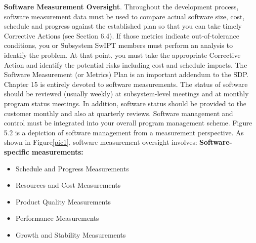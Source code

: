 \documentclass{book}
\begin{document}
\begin{multicols}{2}
		\textbf{Software Measurement Oversight}. Throughout the
		development process, software measurement data must
		be used to compare actual software size, cost, schedule
		and progress against the established plan so that you
		can take timely Corrective Actions (see Section 6.4). If
		those metrics indicate out-of-tolerance conditions, you or
		Subsystem SwIPT members must perform an analysis to
		identify the problem. At that point, you must take the
		appropriate Corrective Action and identify the potential
		risks including cost and schedule impacts. The Software
		Measurement (or Metrics) Plan is an important addendum
		to the SDP. Chapter 15 is entirely devoted to software
		measurements.
		The status of software should be reviewed (usually
		weekly) at subsystem-level meetings and at monthly program
		status meetings. In addition, software status should be provided to the customer monthly and also at quarterly reviews.
		Software management and control must be integrated into
		your overall program management scheme. Figure 5.2 is a
		depiction of software management from a measurement
		perspective.
		As shown in Figure{\ref{pic1}}, software measurement oversight
		involves:
		\textbf{Software-specific measurements:}
		\begin{itemize}
		\item Schedule and Progress Measurements
		\item Resources and Cost Measurements
	    \item Product Quality Measurements
		\item Performance Measurements
		\item Growth and Stability Measurements
		\end{itemize}
		

\end{multicols}
\end{document}
